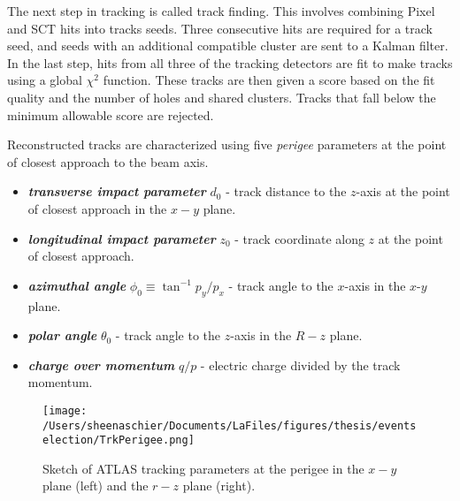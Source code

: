 The next step in tracking is called track finding.  This involves combining Pixel and SCT hits into tracks seeds.  Three consecutive hits are required for a track seed, and seeds with an additional compatible cluster are sent to a Kalman filter.  In the last step, hits from all three of the tracking detectors are fit to make tracks using a global $\chi^2$ function.  These tracks are then given a score based on the fit quality and the number of holes and shared clusters.  Tracks that fall below the minimum allowable score are rejected.


Reconstructed tracks are characterized using five \textit{perigee} parameters at the point of closest approach to the beam axis.  
\begin{itemize}
\item \textbf{\textit{transverse impact parameter}} $d_0$ - track distance to the $z$-axis at the point of closest approach in the $x-y$ plane.
\item \textbf{\textit{longitudinal impact parameter}} $z_0$ - track coordinate along $z$ at the point of closest approach.
\item \textbf{\textit{azimuthal angle}} $\phi_0\equiv\tan^{-1} p_y/p_x$ - track angle to the $x$-axis in the $x$-$y$ plane.
\item \textbf{\textit{polar angle}} $\theta_0$ - track angle to the $z$-axis in the $R-z$ plane.
\item \textbf{\textit{charge over momentum}} $q/p$ - electric charge divided by the track momentum.
\end{itemize}
  \begin{figure}[tbp]
       \texttt{[image: /Users/sheenaschier/Documents/LaFiles/figures/thesis/eventselection/TrkPerigee.png]}\\
   \caption{Sketch of ATLAS tracking parameters at the perigee in the $x-y$ plane (left) and the $r-z$ plane (right). }
   \label{fig:trkParam}
 \end{figure}
 
